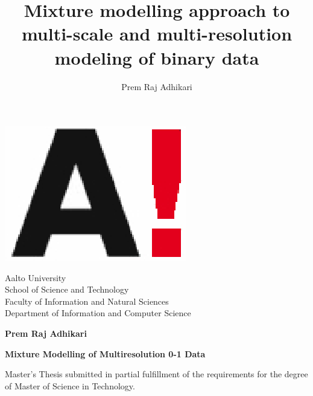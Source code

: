 \documentclass[a4paper,12pt,oneside]{book}
\author{Prem Raj Adhikari}
\title{Mixture modelling approach to multi-scale and multi-resolution modeling of binary data}
\begin{document}
\frontmatter %


	\thispagestyle{empty} 		%

	\begin{flushleft}
	\includegraphics[bb=0.7cm 0.7cm 2cm 3cm, scale = .7]{figures/aaltologo}
	
	\vspace{-1.65cm}
	
	\hspace{2.3cm} Aalto University   \\
	\hspace{2.3cm} School of Science and Technology \\
	\hspace{2.3cm} Faculty of Information and Natural Sciences \\
	\hspace{2.3cm} Department of Information and Computer Science \\
	\end{flushleft}
	\vspace{2cm}

	\begin{flushleft}
	\large \bf Prem Raj Adhikari \\
	\end{flushleft}
	
	\vspace{1cm}
	
	\begin{flushleft}
	\LARGE \bf Mixture Modelling of Multiresolution \mbox{0-1} Data
	
	\end{flushleft}
	\vspace{5.0cm} 
	
	\begin{flushleft}
	Master's Thesis submitted in partial fulfillment of the requirements for the degree of Master of Science in Technology.
	\end{flushleft}
	\vspace{0.2cm}
	
\end{document}
